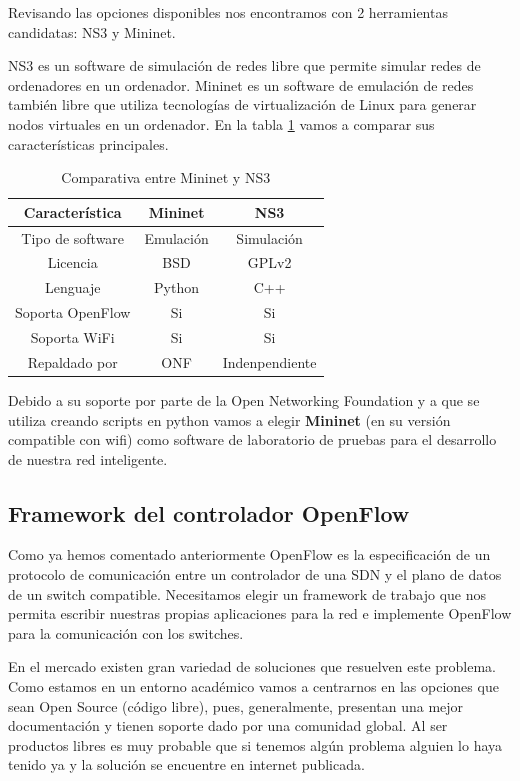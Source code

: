 Revisando las opciones disponibles nos encontramos con 2 herramientas candidatas: NS3 \cite{ns3adisc22:online} y Mininet\cite{MininetA12:online}.

NS3 es un software de simulación de redes libre que permite simular redes de ordenadores en un ordenador. Mininet es un software de emulación de redes también libre que utiliza tecnologías de virtualización de Linux para generar nodos virtuales en un ordenador. En la tabla \ref{tab:mininet_ns3} vamos a comparar sus características principales.

\begin{table}[h!]
    \centering
    \begin{tabular}{|c|c|c|}
    \hline
        Característica & Mininet & NS3  \\
    \hline
         Tipo de software & Emulación & Simulación\\
    \hline
        Licencia & BSD & GPLv2 \\
    \hline
        Lenguaje & Python & C++ \\
    \hline
        Soporta OpenFlow & Si & Si \\
    \hline
        Soporta WiFi & Si & Si \\
    \hline
        Repaldado por & ONF  & Indenpendiente \\
    \hline
    \end{tabular}
    \caption{Comparativa entre Mininet y NS3}
    \label{tab:mininet_ns3}
\end{table}

Debido a su soporte por parte de la Open Networking Foundation y a que se utiliza creando scripts en python vamos a elegir \textbf{Mininet} (en su versión compatible con wifi) como software de laboratorio de pruebas para el desarrollo de nuestra red inteligente.

\subsection{Framework del controlador OpenFlow}

Como ya hemos comentado anteriormente OpenFlow es la especificación de un protocolo de comunicación entre un controlador de una SDN y el plano de datos de un switch compatible. Necesitamos elegir un framework de trabajo que nos permita escribir nuestras propias aplicaciones para la red e implemente OpenFlow para la comunicación con los switches.

En el mercado existen gran variedad de soluciones que resuelven este problema. Como estamos en un entorno académico vamos a centrarnos en las opciones que sean Open Source (código libre), pues, generalmente, presentan una mejor documentación y tienen soporte dado por una comunidad global. Al ser productos libres es muy probable que si tenemos algún problema alguien lo haya tenido ya y la solución se encuentre en internet publicada.


